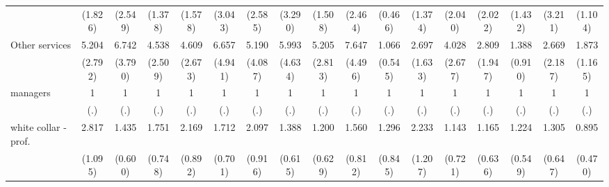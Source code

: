 {\begin{tabular}{l*{16}{c}}
                    &     (1.826)         &     (2.549)         &     (1.378)         &     (1.578)         &     (3.043)         &     (2.585)         &     (3.290)         &     (1.508)         &     (2.464)         &     (0.466)         &     (1.374)         &     (2.040)         &     (2.022)         &     (1.432)         &     (3.211)         &     (1.104)         \\
[1em]
Other services      &       5.204\sym{**} &       6.742\sym{***}&       4.538\sym{**} &       4.609\sym{**} &       6.657\sym{*}  &       5.190\sym{*}  &       5.993\sym{*}  &       5.205\sym{**} &       7.647\sym{***}&       1.066         &       2.697         &       4.028\sym{*}  &       2.809         &       1.388         &       2.669         &       1.873         \\
                    &     (2.792)         &     (3.790)         &     (2.509)         &     (2.673)         &     (4.941)         &     (4.087)         &     (4.634)         &     (2.813)         &     (4.496)         &     (0.545)         &     (1.633)         &     (2.677)         &     (1.947)         &     (0.910)         &     (2.187)         &     (1.165)         \\
[1em]
managers            &           1         &           1         &           1         &           1         &           1         &           1         &           1         &           1         &           1         &           1         &           1         &           1         &           1         &           1         &           1         &           1         \\
                    &         (.)         &         (.)         &         (.)         &         (.)         &         (.)         &         (.)         &         (.)         &         (.)         &         (.)         &         (.)         &         (.)         &         (.)         &         (.)         &         (.)         &         (.)         &         (.)         \\
[1em]
white collar - prof.&       2.817\sym{**} &       1.435         &       1.751         &       2.169         &       1.712         &       2.097         &       1.388         &       1.200         &       1.560         &       1.296         &       2.233         &       1.143         &       1.165         &       1.224         &       1.305         &       0.895         \\
                    &     (1.095)         &     (0.600)         &     (0.748)         &     (0.892)         &     (0.701)         &     (0.916)         &     (0.615)         &     (0.629)         &     (0.812)         &     (0.845)         &     (1.207)         &     (0.721)         &     (0.636)         &     (0.549)         &     (0.647)         &     (0.470)         \\

\end{tabular}}
